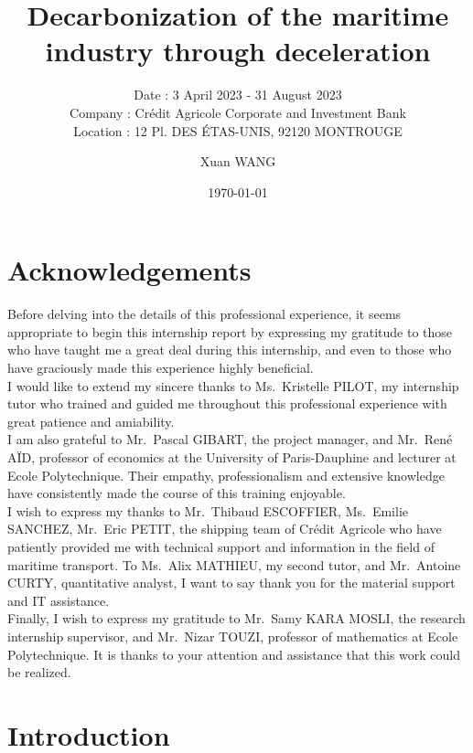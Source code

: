 \documentclass[a4paper,12pt]{article}
\author{Xuan WANG}
\date{\today}
\title{Decarbonization of the maritime industry through deceleration}
\subtitle{
\normalsize
Date : 3 April 2023 - 31 August 2023 \\[8pt]
Company : Crédit Agricole Corporate and Investment Bank  \\[8pt]
Location : 12 Pl. DES ÉTAS-UNIS, 92120 MONTROUGE
}
\begin{document}
\maketitle

\newpage
\thispagestyle{empty}
\section*{Acknowledgements}

Before delving into the details of this professional experience, it seems appropriate to begin this internship report by expressing my gratitude to those who have taught me a great deal during this internship, and even to those who have graciously made this experience highly beneficial.\\

I would like to extend my sincere thanks to Ms.~Kristelle PILOT, my internship tutor who trained and guided me throughout this professional experience with great patience and amiability.\\

I am also grateful to Mr.~Pascal GIBART, the project manager, and Mr.~René AÏD, professor of economics at the University of Paris-Dauphine and lecturer at Ecole Polytechnique.
Their empathy, professionalism and extensive knowledge have consistently made the course of this training enjoyable.\\

I wish to express my thanks to Mr.~Thibaud ESCOFFIER, Ms.~Emilie SANCHEZ, Mr.~Eric PETIT, the shipping team of Crédit Agricole who have patiently provided me with technical support and information in the field of maritime transport.
To Ms.~Alix MATHIEU, my second tutor, and Mr.~Antoine CURTY, quantitative analyst, I want to say thank you for the material support and IT assistance.\\

Finally, I wish to express my gratitude to Mr.~Samy KARA MOSLI, the research internship supervisor, and Mr.~Nizar TOUZI, professor of mathematics at Ecole Polytechnique.
It is thanks to your attention and assistance that this work could be realized.




\newpage
\thispagestyle{empty}
\tableofcontents


\renewcommand{\thepage}{\arabic{page}}

\newpage
\setcounter{page}{1}
\section{Introduction}
\end{document}
